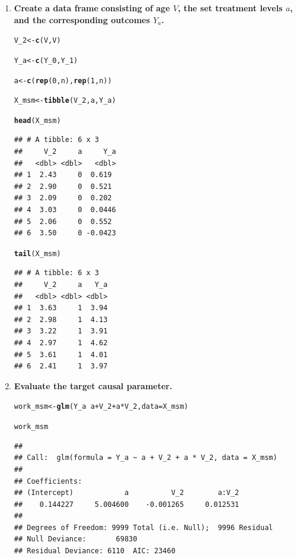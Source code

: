 \documentclass{article}\usepackage[]{graphicx}\usepackage[]{xcolor}
\makeatletter
\newcommand{\hlnum}[1]{\textcolor[rgb]{0.686,0.059,0.569}{#1}}%
\newcommand{\hlopt}[1]{\textcolor[rgb]{0,0,0}{#1}}%
\newcommand{\hlstd}[1]{\textcolor[rgb]{0.345,0.345,0.345}{#1}}%
\newcommand{\hlkwb}[1]{\textcolor[rgb]{0.69,0.353,0.396}{#1}}%
\newcommand{\hlkwc}[1]{\textcolor[rgb]{0.333,0.667,0.333}{#1}}%
\newcommand{\hlkwd}[1]{\textcolor[rgb]{0.737,0.353,0.396}{\textbf{#1}}}%
\newenvironment{kframe}{%
 \def\at@end@of@kframe{}%
 \ifinner\ifhmode%
  \def\at@end@of@kframe{\end{minipage}}%
  \begin{minipage}{\columnwidth}%
 \fi\fi%
 \def\FrameCommand##1{\hskip\@totalleftmargin \hskip-\fboxsep
 \colorbox{shadecolor}{##1}\hskip-\fboxsep
     \hskip-\linewidth \hskip-\@totalleftmargin \hskip\columnwidth}%
 \MakeFramed {\advance\hsize-\width
   \@totalleftmargin\z@ \linewidth\hsize
   \@setminipage}}%
 {\par\unskip\endMakeFramed%
 \at@end@of@kframe}
\newenvironment{knitrout}{}{} %
\makeatother
\begin{document}
\begin{enumerate}[label=\textbf{\arabic*.}]
  \item \textbf{Create a data frame}  \textbf{consisting of age $V$, the set treatment levels $a$, and the corresponding outcomes $Y_a$.}
  
\begin{knitrout}
\color{fgcolor}\begin{kframe}
\begin{alltt}
\hlstd{V_2} \hlkwb{<-} \hlkwd{c}\hlstd{(V, V)}

\hlstd{Y_a} \hlkwb{<-} \hlkwd{c}\hlstd{(Y_0, Y_1)}

\hlstd{a} \hlkwb{<-} \hlkwd{c}\hlstd{(}\hlkwd{rep}\hlstd{(}\hlnum{0}\hlstd{, n),} \hlkwd{rep}\hlstd{(}\hlnum{1}\hlstd{, n))}

\hlstd{X_msm} \hlkwb{<-} \hlkwd{tibble}\hlstd{(V_2, a, Y_a)}

\hlkwd{head}\hlstd{(X_msm)}
\end{alltt}
\begin{verbatim}
## # A tibble: 6 x 3
##     V_2     a     Y_a
##   <dbl> <dbl>   <dbl>
## 1  2.43     0  0.619 
## 2  2.90     0  0.521 
## 3  2.09     0  0.202 
## 4  3.03     0  0.0446
## 5  2.06     0  0.552 
## 6  3.50     0 -0.0423
\end{verbatim}
\begin{alltt}
\hlkwd{tail}\hlstd{(X_msm)}
\end{alltt}
\begin{verbatim}
## # A tibble: 6 x 3
##     V_2     a   Y_a
##   <dbl> <dbl> <dbl>
## 1  3.63     1  3.94
## 2  2.98     1  4.13
## 3  3.22     1  3.91
## 4  2.97     1  4.62
## 5  3.61     1  4.01
## 6  2.41     1  3.97
\end{verbatim}
\end{kframe}
\end{knitrout}
  
  
  \item \textbf{Evaluate the target causal parameter.}
  
\begin{knitrout}
\color{fgcolor}\begin{kframe}
\begin{alltt}
\hlstd{work_msm} \hlkwb{<-} \hlkwd{glm}\hlstd{(Y_a} \hlopt{~} \hlstd{a} \hlopt{+} \hlstd{V_2} \hlopt{+} \hlstd{a}\hlopt{*}\hlstd{V_2,} \hlkwc{data} \hlstd{= X_msm)}

\hlstd{work_msm}
\end{alltt}
\begin{verbatim}
## 
## Call:  glm(formula = Y_a ~ a + V_2 + a * V_2, data = X_msm)
## 
## Coefficients:
## (Intercept)            a          V_2        a:V_2  
##    0.144227     5.004600    -0.001265     0.012531  
## 
## Degrees of Freedom: 9999 Total (i.e. Null);  9996 Residual
## Null Deviance:	    69830 
## Residual Deviance: 6110 	AIC: 23460
\end{verbatim}
\end{kframe}
\end{knitrout}
  

\end{enumerate}
\end{document}
